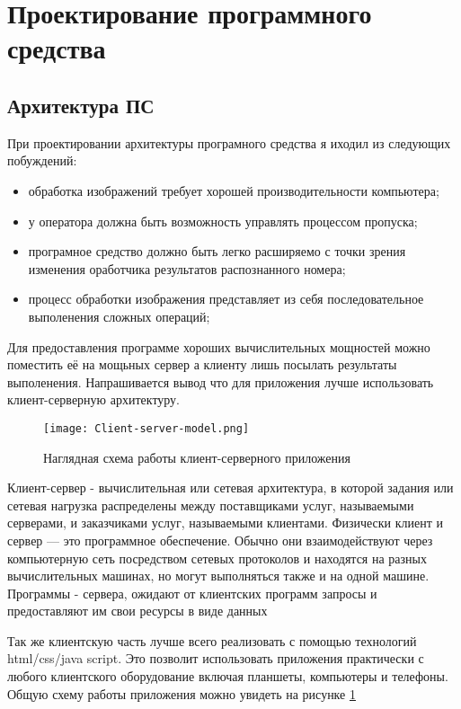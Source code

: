\section{Проектирование программного средства}
\label{sec:arch}

\subsection{Архитектура ПС}
\label{sec:arch_arch}

При проектировании архитектуры програмного средства я иходил из следующих побуждений:
\begin{itemize}
	\item обработка изображений требует хорошей производительности компьютера;
	\item у оператора должна быть возможность управлять процессом пропуска;
	\item програмное средство должно быть легко расширяемо с точки зрения изменения оработчика результатов распознанного номера;
	\item процесс обработки изображения представляет из себя последовательное выполенения сложных операций;
\end{itemize}

Для предоставления программе хороших вычислительных мощностей можно поместить её на мощьных сервер а клиенту лишь посылать результаты выполенения. Напрашивается вывод что для приложения лучше использовать клиент-серверную архитектуру. 

\begin{figure}[ht] 
    \centering
    \texttt{[image: Client-server-model.png]}  
    \caption{Наглядная схема работы клиент-серверного приложения}
    \label{fig:arch_arch:client_server}
\end{figure}

Клиент-сервер - вычислительная или сетевая архитектура, в которой задания или сетевая нагрузка распределены между поставщиками услуг, называемыми серверами, и заказчиками услуг, называемыми клиентами. Физически клиент и сервер — это программное обеспечение. Обычно они взаимодействуют через компьютерную сеть посредством сетевых протоколов и находятся на разных вычислительных машинах, но могут выполняться также и на одной машине. Программы - сервера, ожидают от клиентских программ запросы и предоставляют им свои ресурсы в виде данных

Так же клиентскую часть лучше всего реализовать с помощью технологий html/css/java script. Это позволит использовать приложения практически с любого клиентского оборудование включая планшеты, компьютеры и телефоны. Общую схему работы приложения можно увидеть на рисунке \ref{fig:arch_arch:client_server}

